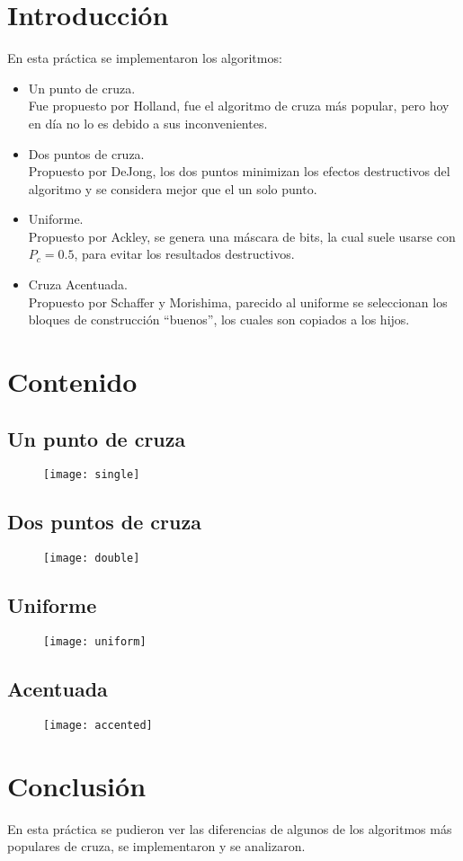 \documentclass{article}
\begin{document}
\maketitle
\tableofcontents
\section{Introducción}
En esta práctica se implementaron los algoritmos:
\begin{itemize}
	\item Un punto de cruza.\\
	Fue propuesto por Holland, fue el algoritmo de cruza más popular, pero hoy en día no lo es debido a sus inconvenientes.
	\item Dos puntos de cruza.\\
	Propuesto por DeJong, los dos puntos minimizan los efectos destructivos del algoritmo y se considera mejor que el un solo punto.
	\item Uniforme.\\
	Propuesto por Ackley, se genera una máscara de bits, la cual suele usarse con $P_c = 0.5$, para evitar los resultados destructivos. 
	\item Cruza Acentuada. \\
	Propuesto por Schaffer y Morishima, parecido al uniforme se seleccionan los bloques de construcción ``buenos'', los cuales son copiados a los hijos.
\end{itemize}
\newpage
\section{Contenido}
\subsection{Un punto de cruza}
\begin{figure}[h!]
	\centering
	\texttt{[image: single]}
\end{figure}
\newpage
\subsection{Dos puntos de cruza}
\begin{figure}[h!]
	\centering
	\texttt{[image: double]}
\end{figure}
\newpage
\subsection{Uniforme}
\begin{figure}[h!]
	\centering
	\texttt{[image: uniform]}
\end{figure}
\newpage
\subsection{Acentuada}
\begin{figure}[h!]
	\centering
	\texttt{[image: accented]}
\end{figure}
\section{Conclusión}
En esta práctica se pudieron ver las diferencias de algunos de los algoritmos más populares de cruza, se implementaron y se analizaron.
\end{document}
